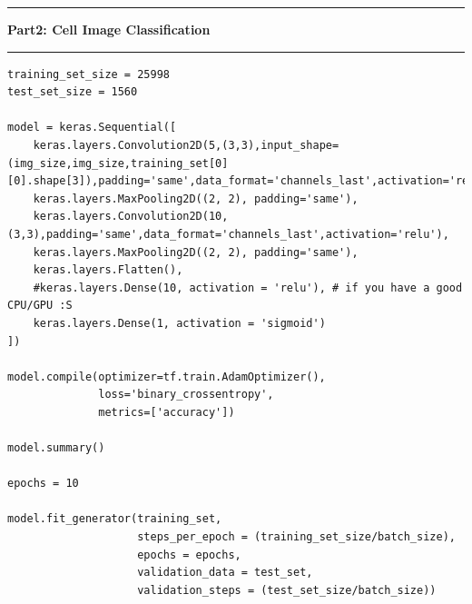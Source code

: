 \documentclass[11pt]{article}
\newcommand\question[2]{\vspace{.25in}\hrule\textbf{#1: #2}\vspace{.5em}\hrule\vspace{.10in}}
\begin{document}
\question{Part2}{Cell Image Classification}
\begin{lstlisting}
training_set_size = 25998
test_set_size = 1560

model = keras.Sequential([
    keras.layers.Convolution2D(5,(3,3),input_shape=(img_size,img_size,training_set[0][0].shape[3]),padding='same',data_format='channels_last',activation='relu'),
    keras.layers.MaxPooling2D((2, 2), padding='same'),
    keras.layers.Convolution2D(10,(3,3),padding='same',data_format='channels_last',activation='relu'),
    keras.layers.MaxPooling2D((2, 2), padding='same'),
    keras.layers.Flatten(),
    #keras.layers.Dense(10, activation = 'relu'), # if you have a good CPU/GPU :S
    keras.layers.Dense(1, activation = 'sigmoid')
])

model.compile(optimizer=tf.train.AdamOptimizer(), 
              loss='binary_crossentropy',
              metrics=['accuracy'])

model.summary()

epochs = 10

model.fit_generator(training_set,
                    steps_per_epoch = (training_set_size/batch_size),
                    epochs = epochs,
                    validation_data = test_set,
                    validation_steps = (test_set_size/batch_size))
\end{lstlisting}
\end{document}
